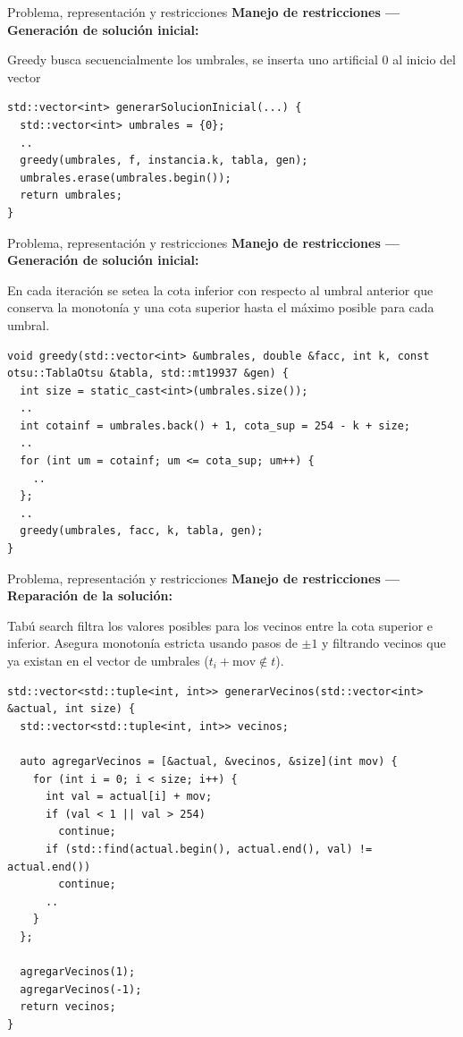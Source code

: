\documentclass[aspectratio=169, 10pt]{beamer}
\begin{document}
\begin{frame}[fragile]{Problema, representación y restricciones}
  \textbf{Manejo de restricciones --- Generación de solución inicial:}

  Greedy busca secuencialmente los umbrales, se inserta uno artificial 0 al inicio del vector
\begin{verbatim}
std::vector<int> generarSolucionInicial(...) {
  std::vector<int> umbrales = {0};
  ..
  greedy(umbrales, f, instancia.k, tabla, gen);
  umbrales.erase(umbrales.begin());
  return umbrales;
}
\end{verbatim}
\end{frame}

\begin{frame}[fragile]{Problema, representación y restricciones}
  \textbf{Manejo de restricciones --- Generación de solución inicial:}

  En cada iteración se setea la cota inferior con respecto al umbral anterior que conserva la monotonía y una cota superior hasta el máximo posible para cada umbral.
\begin{verbatim}
void greedy(std::vector<int> &umbrales, double &facc, int k, const otsu::TablaOtsu &tabla, std::mt19937 &gen) {
  int size = static_cast<int>(umbrales.size());
  ..
  int cotainf = umbrales.back() + 1, cota_sup = 254 - k + size;
  ..
  for (int um = cotainf; um <= cota_sup; um++) {
    ..
  };
  ..
  greedy(umbrales, facc, k, tabla, gen);
}
\end{verbatim}
\end{frame}

\begin{frame}[fragile]{Problema, representación y restricciones}
  \textbf{Manejo de restricciones --- Reparación de la solución:}

  Tabú search filtra los valores posibles para los vecinos entre la cota superior e inferior. Asegura monotonía estricta usando pasos de $\pm 1$ y filtrando vecinos que ya existan en el vector de umbrales ($t_i + \text{mov} \notin t$).
\begin{verbatim}
std::vector<std::tuple<int, int>> generarVecinos(std::vector<int> &actual, int size) {
  std::vector<std::tuple<int, int>> vecinos;

  auto agregarVecinos = [&actual, &vecinos, &size](int mov) {
    for (int i = 0; i < size; i++) {
      int val = actual[i] + mov;
      if (val < 1 || val > 254)
        continue;
      if (std::find(actual.begin(), actual.end(), val) != actual.end())
        continue;
      ..
    }
  };

  agregarVecinos(1);
  agregarVecinos(-1);
  return vecinos;
}
\end{verbatim}
\end{frame}
\end{document}
